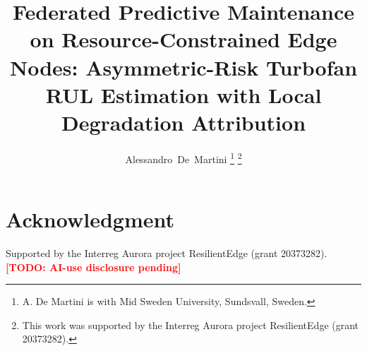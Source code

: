 \documentclass[journal]{IEEEtran}
\newcommand{\todo}[1]{\textcolor{red}{\textbf{[TODO: #1]}}}
\begin{document}
\title{Federated Predictive Maintenance on Resource-Constrained Edge Nodes: Asymmetric-Risk Turbofan RUL Estimation with Local Degradation Attribution}

\author{Alessandro~De~Martini%
\thanks{A. De Martini is with Mid Sweden University, Sundsvall, Sweden.}%
\thanks{This work was supported by the Interreg Aurora project ResilientEdge (grant 20373282).}}


\maketitle











\section*{Acknowledgment}
Supported by the Interreg Aurora project ResilientEdge (grant 20373282). \todo{AI-use disclosure pending}



\end{document}
